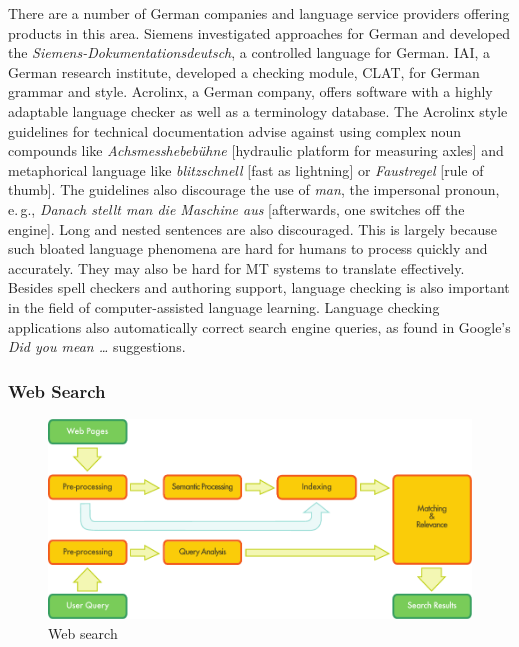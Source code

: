 \begin{multicols}{2}

There are a number of German companies and language service providers offering products in this area. Siemens investigated approaches for German and developed the \textit{Siemens-Dokumentationsdeutsch}, a controlled language for German. IAI, a German research institute, developed a checking module, CLAT, for German grammar and style. Acrolinx, a German company, offers software with a highly adaptable language checker as well as a terminology database. The Acrolinx style guidelines for technical documentation advise against using complex noun compounds like \textit{Achsmesshebebühne} {[}hydraulic platform for measuring axles{]} and metaphorical language like \textit{blitzschnell} {[}fast as lightning{]} or \textit{Faustregel} {[}rule of thumb{]}. The guidelines also discourage the use of \textit{man}, the impersonal pronoun, e.\,g., \textit{Danach stellt man die Maschine aus} {[}afterwards, one switches off the engine{]}. Long and nested sentences are also discouraged. This is largely because such bloated language phenomena are hard for humans to process quickly and accurately. They may also be hard for MT systems to translate effectively. Besides spell checkers and authoring support, language checking is also important in the field of computer-assisted language learning. Language checking applications also automatically correct search engine queries, as found in Google's \textit{Did you mean \dots} suggestions.

\subsubsection{Web Search}

\begin{figure}[htb]
  \center
  \includegraphics[width=\textwidth]{../_media/english/web_search_architecture}
  \caption{Web search}
  \label{fig:websearcharch_en}
 \end{figure}


\end{multicols}

